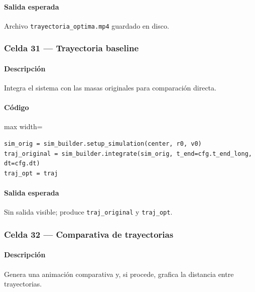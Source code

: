 \paragraph{Salida esperada} Archivo \texttt{trayectoria\_optima.mp4} guardado en disco.

\subsubsection*{Celda 31 — Trayectoria baseline}
\paragraph{Descripción} Integra el sistema con las masas originales para comparación directa.
\paragraph{Código}
\begin{listing}[H]
\caption{Celda 31: trayectoria con masas originales}
\begin{adjustbox}{max width=\textwidth}
\begin{minipage}{\textwidth}
\begin{verbatim}
sim_orig = sim_builder.setup_simulation(center, r0, v0)
traj_original = sim_builder.integrate(sim_orig, t_end=cfg.t_end_long, dt=cfg.dt)
traj_opt = traj
\end{verbatim}
\end{minipage}
\end{adjustbox}
\end{listing}
\paragraph{Salida esperada} Sin salida visible; produce \texttt{traj\_original} y \texttt{traj\_opt}.

\subsubsection*{Celda 32 — Comparativa de trayectorias}
\paragraph{Descripción} Genera una animación comparativa y, si procede, grafica la distancia entre trayectorias.
